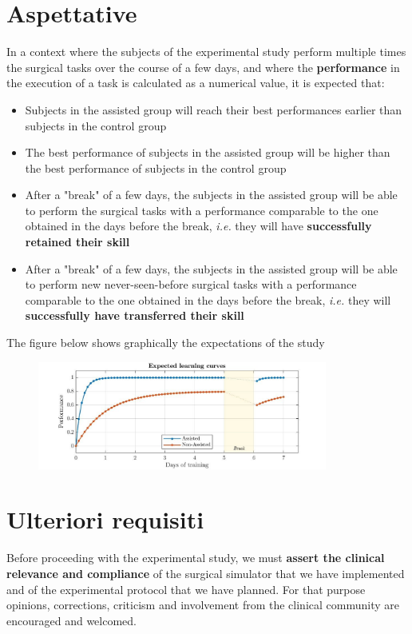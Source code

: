 \documentclass{article}
\begin{document}
\section{Aspettative}
In a context where the subjects of the experimental study perform multiple times the surgical tasks over the course of a few days, and where the \textbf{performance} in the execution of a task is calculated as a numerical value, it is expected that:
\begin{itemize}
  \item Subjects in the assisted group will reach their best performances earlier than subjects in the control group
  \item The best performance of subjects in the assisted group will be higher than the best performance of subjects in the control group
  \item After a "break" of a few days, the subjects in the assisted group will be able to perform the surgical tasks with a performance comparable to the one obtained in the days before the break, \textit{i.e.} they will have \textbf{successfully retained their skill}
  \item After a "break" of a few days, the subjects in the assisted group will be able to perform new never-seen-before surgical tasks with a performance comparable to the one obtained in the days before the break, \textit{i.e.} they will \textbf{successfully have transferred their skill}
\end{itemize} 
The figure below shows graphically the expectations of the study

\begin{figure}[!h]
  \centering
  \includegraphics[width=0.85\textwidth]{expected.jpg}
  \end{figure} 
\section{Ulteriori requisiti}
Before proceeding with the experimental study, we must \textbf{assert the clinical relevance and compliance} of the surgical simulator that we have implemented and of the experimental protocol that we have planned. For that purpose opinions, corrections, criticism and involvement from the clinical community are encouraged and welcomed. 
\end{document}
